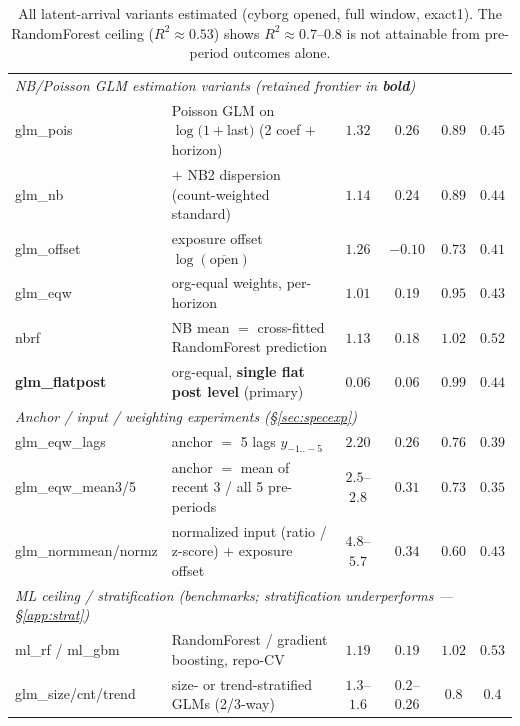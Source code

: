 \documentclass[11pt]{article}
\begin{document}
\begin{table}[h]
\begin{tabular}{llcccc}
\multicolumn{6}{l}{\emph{NB/Poisson GLM estimation variants (retained frontier in \textbf{bold})}}\\
glm\_pois             & Poisson GLM on $\log(1+$last$)$ (2 coef $+$ horizon)                     & $1.32$ & $0.26$ & $0.89$ & $0.45$\\
glm\_nb               & $+$ NB2 dispersion (count-weighted standard)                            & $1.14$ & $0.24$ & $0.89$ & $0.44$\\
glm\_offset           & exposure offset $\log(\overline{\text{open}})$                          & $1.26$ & $-0.10$ & $0.73$ & $0.41$\\
glm\_eqw              & org-equal weights, per-horizon                                          & $1.01$ & $0.19$ & $0.95$ & $0.43$\\
nbrf                  & NB mean $=$ cross-fitted RandomForest prediction                        & $1.13$ & $0.18$ & $1.02$ & $0.52$\\
\textbf{glm\_flatpost} & org-equal, \textbf{single flat post level} (primary)                   & $\mathbf{0.06}$ & $\mathbf{0.06}$ & $\mathbf{0.99}$ & $0.44$\\
\multicolumn{6}{l}{\emph{Anchor / input / weighting experiments (\S\ref{sec:specexp})}}\\
glm\_eqw\_lags        & anchor $=$ 5 lags $y_{-1..-5}$                                           & $2.20$ & $0.26$ & $0.76$ & $0.39$\\
glm\_eqw\_mean3/5     & anchor $=$ mean of recent 3 / all 5 pre-periods                         & $2.5$--$2.8$ & $0.31$ & $0.73$ & $0.35$\\
glm\_normmean/normz   & normalized input (ratio / z-score) $+$ exposure offset                  & $4.8$--$5.7$ & $0.34$ & $0.60$ & $0.43$\\
\multicolumn{6}{l}{\emph{ML ceiling / stratification (benchmarks; stratification underperforms --- \S\ref{app:strat})}}\\
ml\_rf / ml\_gbm      & RandomForest / gradient boosting, repo-CV                               & $1.19$ & $0.19$ & $1.02$ & $0.53$\\
glm\_size/cnt/trend   & size- or trend-stratified GLMs (2/3-way)                                & $1.3$--$1.6$ & $0.2$--$0.26$ & $0.8$ & $0.4$\\
\bottomrule
\end{tabular}
\caption{All latent-arrival variants estimated (cyborg opened, full window, exact1). The RandomForest ceiling ($R^2\approx0.53$) shows $R^2\approx0.7$--$0.8$ is not attainable from pre-period outcomes alone.}
\end{table}
\end{document}
